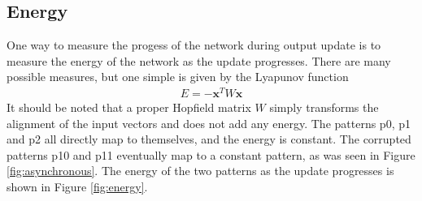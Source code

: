 \documentclass[a4paper]{article}
\begin{document}
\subsection{Energy}
One way to measure the progess of the network during output update is to measure the energy of the network as the update progresses. There are many possible measures, but one simple is given by the Lyapunov function 
\begin{align*}
  E = - \mathbf{x}^T W \mathbf{x}
\end{align*}
It should be noted that a proper Hopfield matrix $W$ simply transforms the alignment of the input vectors and does not add any energy. The patterns p0, p1 and p2 all directly map to themselves, and the energy is constant. The corrupted patterns p10 and p11 eventually map to a constant pattern, as was seen in Figure \ref{fig:asynchronous}.
The energy of the two patterns as the update progresses is shown in Figure \ref{fig:energy}.
\end{document}

